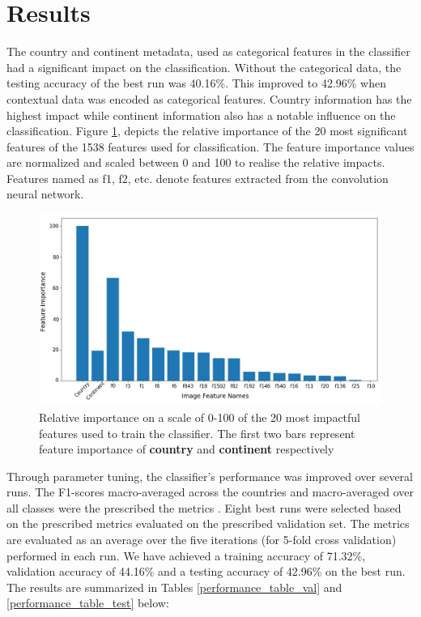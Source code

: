 \documentclass[
]{ceurart}
\begin{document}
\section{Results}

The country and continent metadata, used as categorical features in the classifier had a significant impact on the classification. Without the categorical data, the testing accuracy of the best run was 40.16\%. This improved to 42.96\% when contextual data was encoded as categorical features. Country information has the highest impact while continent information also has a notable influence on the classification. Figure \ref{fig1_feature_imp}, depicts the relative importance of the 20 most significant features of the 1538 features used for classification. The feature importance values are normalized and scaled between 0 and 100 to realise the relative impacts. Features named as f1, f2, etc. denote features extracted from the convolution neural network.

\begin{figure}[!hbt]
  \centering
  \includegraphics[width=1.0\columnwidth]{FeatureImp}
  \caption{Relative importance on a scale of 0-100 of the 20 most impactful features used to train the classifier. The first two bars represent feature importance of \textbf{country} and \textbf{continent} respectively}
  \label{fig1_feature_imp}
\end{figure}

Through parameter tuning, the classifier's performance was improved over several runs. The F1-scores macro-averaged across the countries and macro-averaged over all classes were the prescribed the metrics \cite{snakeclef2021}. Eight best runs were selected based on the prescribed metrics evaluated on the prescribed validation set. The metrics are evaluated as an average over the five iterations (for 5-fold cross validation) performed in each run. We have achieved a training accuracy of 71.32\%, validation accuracy of 44.16\% and a testing accuracy of 42.96\% on the best run. The results are summarized in Tables \ref{performance_table_val} and \ref{performance_table_test} below:
\end{document}
